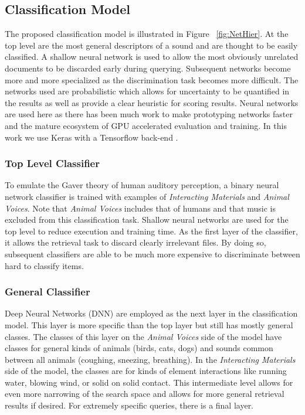 \subsection{Classification Model}

The proposed classification model is illustrated in Figure ~\ref{fig:NetHier}. At the top level are the most general descriptors of a sound and are thought to be easily classified. A shallow neural network is used to allow the most obviously unrelated documents to be discarded early during querying. Subsequent networks become more and more specialized as the discrimination task becomes more difficult. The networks used are probabilistic which allows for uncertainty to be quantified in the results as well as provide a clear heuristic for scoring results. Neural networks are used here as there has been much work to make prototyping networks faster and the mature ecosystem of GPU accelerated evaluation and training. In this work we use Keras with a Tensorflow back-end \cite{Abadi2016, chollet2015keras}.

\subsubsection{Top Level Classifier}
To emulate the Gaver theory of human auditory perception, a binary neural network classifier is trained with examples of \textit{Interacting Materials} and \textit{Animal Voices}. Note that \textit{Animal Voices} includes that of humans and that music is excluded from this classification task. Shallow neural networks are used for the top level to reduce execution and training time. As the first layer of the classifier, it allows the retrieval task to discard clearly irrelevant files. By doing so, subsequent classifiers are able to be much more expensive to discriminate between hard to classify items.

\subsubsection{General Classifier}
Deep Neural Networks (DNN) are employed as the next layer in the classification model. This layer is more specific than the top layer but still has mostly general classes. The classes of this layer on the \textit{Animal Voices} side of the model have classes for general kinds of animals (birds, cats, dogs) and sounds common between all animals (coughing, sneezing, breathing). In the \textit{Interacting Materials} side of the model, the classes are for kinds of element interactions like running water, blowing wind, or solid on solid contact. This intermediate level allows for even more narrowing of the search space and allows for more general retrieval results if desired. For extremely specific queries, there is a final layer.

